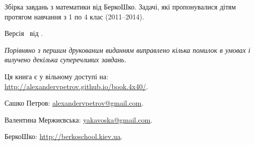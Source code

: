 
{
\fontsize{\OPTinfopagefontsize}{2.0\OPTinfopagefontsize}\selectfont

\noindent
Збірка завдань з математики від БеркоШко.
Задачі, які пропонувалися дітям протягом навчання з 1 по 4 клас (2011--2014).

\bigskip

\noindent
Версія \Version\ від \Date.

\bigskip

\noindent
\emph{Порівняно з першим друкованим виданням виправлено кілька помилок
в умовах і вилучено декілька суперечливих завдань.}

\bigskip

\noindent
Ця книга є у вільному доступі на:\\
\url{http://alexandervpetrov.github.io/book.4x40/}.

\bigskip

\noindent
Сашко Петров: \href{mailto:alexandervpetrov@gmail.com}{alexandervpetrov@gmail.com}.

\noindent
Валентина Мержиєвська: \href{mailto:yakavoska@gmail.com}{yakavoska@gmail.com}.

\bigskip

\noindent
БеркоШко: \url{http://berkoschool.kiev.ua}.
}

\clearpage
